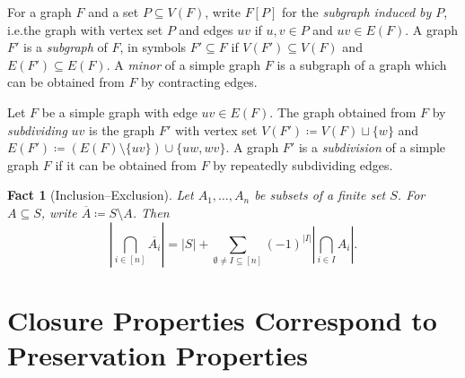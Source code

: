 \documentclass[3p,final]{elsarticle}
\newtheorem{lemma}[theorem]{Lemma}
\newtheorem{fact}[theorem]{Fact}
\begin{document}
	For a graph $F$ and a set $P \subseteq V(F)$, write $F[P]$ for the \emph{subgraph induced by $P$}, i.e.\@ the graph with vertex set $P$ and edges $uv$ if $u,v \in P$ and $uv \in E(F)$.
	A graph $F'$ is a \emph{subgraph} of $F$, in symbols $F' \subseteq F$ if $V(F') \subseteq V(F)$ and $E(F') \subseteq E(F)$.
	A \emph{minor} of a simple graph $F$ is a subgraph of a graph which can be obtained from $F$ by contracting edges. 
	
	Let $F$ be a simple graph with edge $uv \in E(F)$. 
	The graph obtained from $F$ by \emph{subdividing} $uv$ is the graph $F'$ with vertex set $V(F') \coloneqq V(F) \sqcup \{w\}$ and $E(F') \coloneqq (E(F) \setminus \{uv\}) \cup \{uw, wv\}$.
	A graph $F'$ is a \emph{subdivision} of a simple graph $F$ if it can be obtained from $F$ by repeatedly subdividing edges.
	
	\begin{fact}[Inclusion--Exclusion] \label{fact:incl-excl}
		Let $A_1, \dots, A_n$ be subsets of a finite set $S$. For $A \subseteq S$, write $\overline{A} \coloneqq S \setminus A$. Then
		\[
		\left\lvert \bigcap_{i \in [n]} \overline{A_i} \right\rvert = |S| +  \sum_{\emptyset \neq I \subseteq [n]} (-1)^{|I|} \left\lvert \bigcap_{i \in I} A_i \right\rvert.
		\]
	\end{fact}
	
%	
	
	\section{Closure Properties Correspond to Preservation Properties}
	\label{sec:syntax-semantics}
	
\end{document}

